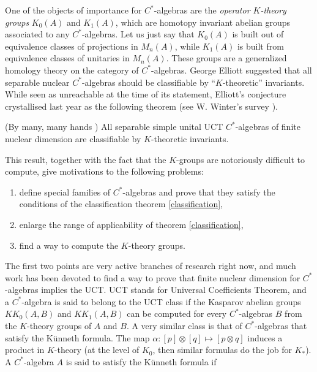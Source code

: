 One of the objects of importance for $C^*$-algebras are the \textit{operator $K$-theory groups} $K_0(A)$ and $K_1(A)$, which are homotopy invariant abelian groups associated to any $C^*$-algebras. Let us just say that $K_0(A)$ is built out of equivalence classes of projections in $M_n(A)$, while $K_1(A)$ is built from equivalence classes of unitaries in $M_n(A)$. These groups are a generalized homology theory on the category of $C^*$-algebras. George Elliott suggested that all separable nuclear $C^*$-algebras should be classifiable by ``$K$-theoretic'' invariants. While seen as unreachable at the time of its statement, Elliott's conjecture crystallised last year as the following theorem (see W. Winter's survey \cite{WinterClassification}).

\begin{theorem}\label{classification}(By many, many hands \cite{WinterClassification}) All separable simple unital UCT $C^*$-algebras of finite nuclear dimension are classifiable by $K$-theoretic invariants.
\end{theorem}

This result, together with the fact that the $K$-groups are notoriously difficult to compute, give motivations to the following problems:
\begin{enumerate}
\item define special families of $C^*$-algebras and prove that they satisfy the conditions of the classification theorem \ref{classification},
\item enlarge the range of applicability of theorem \ref{classification},
\item find a way to compute the $K$-theory groups.
\end{enumerate}    

The first two points are very active branches of research right now, and much work has been devoted to find a way to prove that finite nuclear dimension for $C^*$-algebras implies the UCT. UCT stands for Universal Coefficients Theorem, and a $C^*$-algebra is said to belong to the UCT class if the Kasparov abelian groups $KK_0(A,B)$ and $KK_1(A,B)$ can be computed for every $C^*$-algebras $B$ from the $K$-theory groups of $A$ and $B$. A very similar class is that of $C^*$-algebras that satisfy the K\"unneth formula. The map $\alpha: [p]\otimes [q] \mapsto [p\otimes q]$ induces a product in $K$-theory (at the level of $K_0$, then similar formulas do the job for $K_*$). A $C^*$-algebra $A$ is said to satisfy the K\"unneth formula if 

